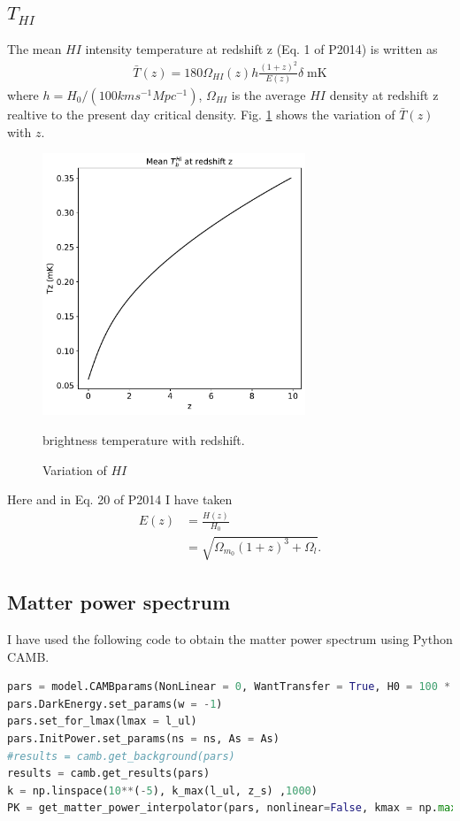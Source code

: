 \documentclass[12pt,a4paper]{article}
\begin{document}
\subsection{$ T_{HI} $}
The mean $ HI $ intensity temperature at redshift z (Eq. 1 of P2014) is written as
\begin{align}
\bar{T}(z) = 180 \Omega_{HI}(z) h \frac{(1 + z)^2}{E(z)}\delta \; \mathrm{mK}
\end{align}
where $ h = H_0 / (100 kms^{-1}Mpc^{-1})$, $ \Omega_{HI} $ is the average $ HI $ density at redshift z realtive to the present day critical density. Fig. \ref{fig:tz-vs-z} shows the variation of $ \bar{T}(z) $ with $ z $.
\begin{figure}
	\centering
	\includegraphics[width=0.7\textwidth]{variation-of-tz-with-z}
	\caption{Variation of $ HI $} brightness temperature with redshift. 
	\label{fig:tz-vs-z}
\end{figure}
Here and in Eq. 20 of P2014 I have taken
\begin{align}
E(z) &= \frac{H(z)}{H_0}\\
&= \sqrt{\Omega_{m_0} (1 + z)^3 + \Omega_{l}}.
\end{align}

\subsection{Matter power spectrum}
I have used the following code to obtain the matter power spectrum using Python CAMB.
\begin{lstlisting}[language=python]
pars = model.CAMBparams(NonLinear = 0, WantTransfer = True, H0 = 100 * h, omch2 = omegach2, ombh2 = omegabh2, YHe = YHe)
pars.DarkEnergy.set_params(w = -1)
pars.set_for_lmax(lmax = l_ul)
pars.InitPower.set_params(ns = ns, As = As)
#results = camb.get_background(pars)
results = camb.get_results(pars)
k = np.linspace(10**(-5), k_max(l_ul, z_s) ,1000)
PK = get_matter_power_interpolator(pars, nonlinear=False, kmax = np.max(k), k_hunit = False, hubble_units = False)
\end{lstlisting}
\end{document}
